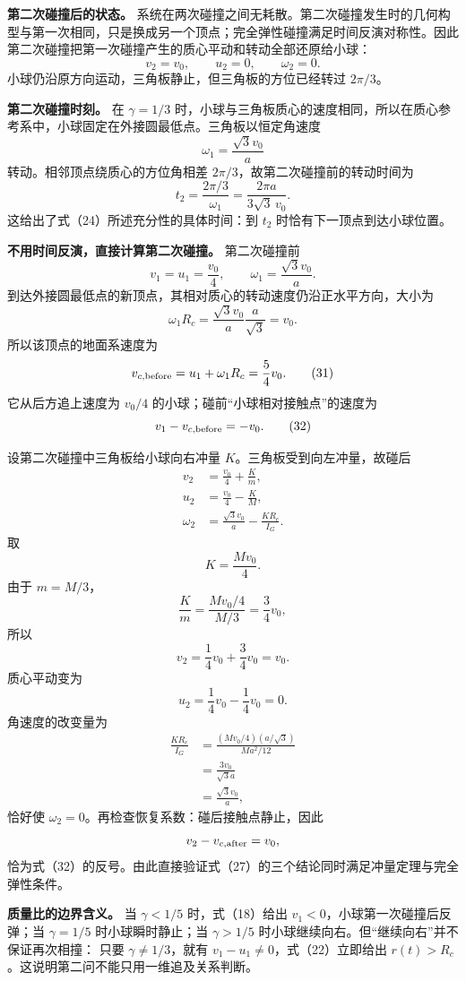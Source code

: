 \documentclass[12pt,a4paper,UTF8]{ctexart}
\begin{document}
\textbf{第二次碰撞后的状态。}
系统在两次碰撞之间无耗散。第二次碰撞发生时的几何构型与第一次相同，只是换成另一个顶点；完全弹性碰撞满足时间反演对称性。因此第二次碰撞把第一次碰撞产生的质心平动和转动全部还原给小球：
\[
\boxed{
v_2=v_0,\qquad
u_2=0,\qquad
\omega_2=0
}. \tag{27}
\] 小球仍沿原方向运动，三角板静止，但三角板的方位已经转过 \(2\pi/3\)。

\textbf{第二次碰撞时刻。} 在 \(\gamma=1/3\)
时，小球与三角板质心的速度相同，所以在质心参考系中，小球固定在外接圆最低点。三角板以恒定角速度
\[
\omega_1=\frac{\sqrt3v_0}{a}
\] 转动。相邻顶点绕质心的方位角相差
\(2\pi/3\)，故第二次碰撞前的转动时间为 \[
\boxed{
t_2=\frac{2\pi/3}{\omega_1}
=\frac{2\pi a}{3\sqrt3\,v_0}
}. \tag{28}
\] 这给出了式（24）所述充分性的具体时间：到 \(t_2\)
时恰有下一顶点到达小球位置。

\textbf{不用时间反演，直接计算第二次碰撞。} 第二次碰撞前 \[
v_1=u_1=\frac{v_0}{4},
\qquad
\omega_1=\frac{\sqrt3v_0}{a}. \tag{29}
\] 到达外接圆最低点的新顶点，其相对质心的转动速度仍沿正水平方向，大小为
\[
\omega_1R_c
=\frac{\sqrt3v_0}{a}\frac a{\sqrt3}
=v_0. \tag{30}
\] 所以该顶点的地面系速度为 \[
v_{c,{\rm before}}
=u_1+\omega_1R_c
=\frac54v_0. \tag{31}
\] 它从后方追上速度为 \(v_0/4\) 的小球；碰前``小球相对接触点''的速度为
\[
v_1-v_{c,{\rm before}}=-v_0. \tag{32}
\]

设第二次碰撞中三角板给小球向右冲量 \(K\)。三角板受到向左冲量，故碰后 \[
\begin{aligned}
v_2&=\frac{v_0}{4}+\frac Km,\\
u_2&=\frac{v_0}{4}-\frac KM,\\
\omega_2&=\frac{\sqrt3v_0}{a}
-\frac{KR_c}{I_G}.
\end{aligned} \tag{33}
\] 取 \[
K=\frac{Mv_0}{4}. \tag{34}
\] 由于 \(m=M/3\)， \[
\frac Km
=\frac{Mv_0/4}{M/3}
=\frac34v_0, \tag{35}
\] 所以 \[
v_2=\frac14v_0+\frac34v_0=v_0. \tag{36}
\] 质心平动变为 \[
u_2=\frac14v_0-\frac14v_0=0. \tag{37}
\] 角速度的改变量为 \[
\begin{aligned}
\frac{KR_c}{I_G}
&=\frac{(Mv_0/4)(a/\sqrt3)}
{Ma^2/12}\\
&=\frac{3v_0}{\sqrt3a}\\
&=\frac{\sqrt3v_0}{a},
\end{aligned} \tag{38}
\] 恰好使 \(\omega_2=0\)。再检查恢复系数：碰后接触点静止，因此 \[
v_2-v_{c,{\rm after}}=v_0,
\]
恰为式（32）的反号。由此直接验证式（27）的三个结论同时满足冲量定理与完全弹性条件。

\textbf{质量比的边界含义。} 当 \(\gamma<1/5\) 时，式（18）给出
\(v_1<0\)，小球第一次碰撞后反弹；当 \(\gamma=1/5\) 时小球瞬时静止；当
\(\gamma>1/5\) 时小球继续向右。但``继续向右''并不保证再次相撞： 只要
\(\gamma\ne1/3\)，就有 \(v_1-u_1\ne0\)，式（22）立即给出
\(r(t)>R_c\)。这说明第二问不能只用一维追及关系判断。
\end{document}
